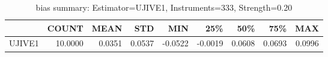 \begin{table}[ht]
\centering
\caption{bias summary: Estimator=UJIVE1, Instruments=333, Strength=0.20}
\begin{tabular}{lrrrrrrrr}
\toprule
 & COUNT & MEAN & STD & MIN & 25\% & 50\% & 75\% & MAX \\
\midrule
UJIVE1 & 10.0000 & 0.0351 & 0.0537 & -0.0522 & -0.0019 & 0.0608 & 0.0693 & 0.0996 \\
\bottomrule
\end{tabular}
\end{table}

